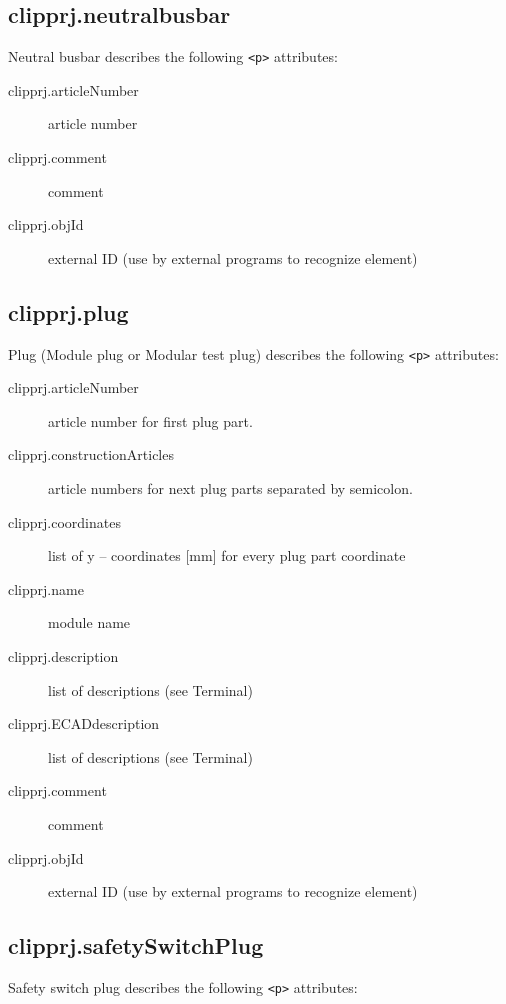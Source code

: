 \documentclass[%
	a4paper,
	oneside,
	listof=numbered,
	parskip=half,
	headsepline=true,
	footsepline=true,
	]{scrbook}
\begin{document}
\subsection{clipprj.neutralbusbar}
 
Neutral busbar describes the following \verb|<p>| attributes: 

\begin{description}
	\item[clipprj.articleNumber] article number 
	\item[clipprj.comment] comment 
	\item[clipprj.objId] external ID (use by external programs to recognize element) 
\end{description}

\subsection{clipprj.plug}
 
Plug (Module plug or Modular test plug) describes the following \verb|<p>| attributes: 

\begin{description}
	\item[clipprj.articleNumber] article number for first plug part. 
	\item[clipprj.constructionArticles] article numbers for next plug parts separated by semicolon. 
	\item[clipprj.coordinates] list of y – coordinates [mm] for every plug part coordinate
	\item[clipprj.name] module name 
	\item[clipprj.description] list of descriptions (see Terminal) 
	\item[clipprj.ECADdescription] list of descriptions (see Terminal) 
	\item[clipprj.comment] comment 
	\item[clipprj.objId] external ID (use by external programs to recognize element) 
\end{description}

\subsection{clipprj.safetySwitchPlug}
 
Safety switch plug describes the following \verb|<p>| attributes: 
\end{document}
